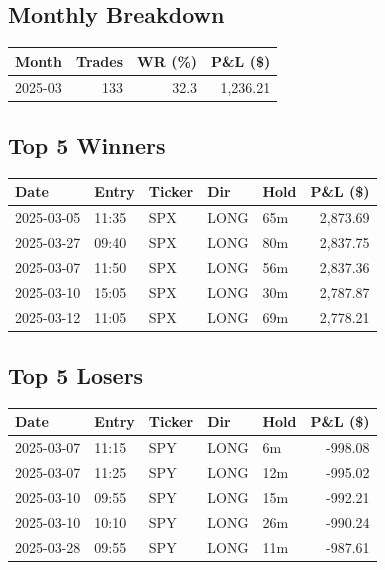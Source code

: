 \documentclass[11pt,a4paper,twoside]{article}
\begin{document}
\subsection{Monthly Breakdown}
\noindent\begin{center}
\begin{tabular}{>{\color{txtmain}}l rrr}
\toprule
\rowcolor{cardbg}
\textbf{Month} & \textbf{Trades} & \textbf{WR (\%)} & \textbf{P\&L (\$)} \\
\midrule
2025-03 & 133 & 32.3 & \textcolor{wingreen}{1,236.21} \\
\bottomrule
\end{tabular}
\end{center}
\subsection{Top 5 Winners}
\noindent\begin{center}
\begin{tabular}{>{\color{txtmain}}l llll r}
\toprule
\rowcolor{cardbg}
\textbf{Date} & \textbf{Entry} & \textbf{Ticker} & \textbf{Dir} & \textbf{Hold} & \textbf{P\&L (\$)} \\
\midrule
2025-03-05 & 11:35 & SPX & LONG & 65m & \textcolor{wingreen}{2,873.69} \\
2025-03-27 & 09:40 & SPX & LONG & 80m & \textcolor{wingreen}{2,837.75} \\
2025-03-07 & 11:50 & SPX & LONG & 56m & \textcolor{wingreen}{2,837.36} \\
2025-03-10 & 15:05 & SPX & LONG & 30m & \textcolor{wingreen}{2,787.87} \\
2025-03-12 & 11:05 & SPX & LONG & 69m & \textcolor{wingreen}{2,778.21} \\
\bottomrule
\end{tabular}
\end{center}
\subsection{Top 5 Losers}
\noindent\begin{center}
\begin{tabular}{>{\color{txtmain}}l llll r}
\toprule
\rowcolor{cardbg}
\textbf{Date} & \textbf{Entry} & \textbf{Ticker} & \textbf{Dir} & \textbf{Hold} & \textbf{P\&L (\$)} \\
\midrule
2025-03-07 & 11:15 & SPY & LONG & 6m & \textcolor{lossred}{-998.08} \\
2025-03-07 & 11:25 & SPY & LONG & 12m & \textcolor{lossred}{-995.02} \\
2025-03-10 & 09:55 & SPY & LONG & 15m & \textcolor{lossred}{-992.21} \\
2025-03-10 & 10:10 & SPY & LONG & 26m & \textcolor{lossred}{-990.24} \\
2025-03-28 & 09:55 & SPY & LONG & 11m & \textcolor{lossred}{-987.61} \\
\bottomrule
\end{tabular}
\end{center}
\clearpage
\end{document}
